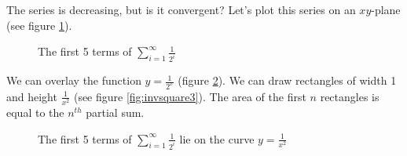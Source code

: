 The series is decreasing, but is it convergent? Let's plot this series on an 
$xy$-plane (see figure \ref{fig:invsquare1}). 

\begin{figure}[htbp]
    \centering
    \caption{The first 5 terms of $\sum_{i = 1}^\infty \frac{1}{2^i}$}
    \label{fig:invsquare1}
\end{figure}

We can overlay the function $y = \frac{1}{2^x}$ (figure \ref{fig:invsquare2}). 
We can draw rectangles of width 1 and height $\frac{1}{x^2}$ (see figure 
\ref{fig:invsquare3}). The area of the first $n$ rectangles is equal to the 
$n^{th}$ partial sum. 

\begin{figure}[htbp]
    \centering
    \caption{The first 5 terms of $\sum_{i = 1}^\infty \frac{1}{2^i}$ lie on 
    the curve $y = \frac{1}{x^2}$}
    \label{fig:invsquare2}
\end{figure}

